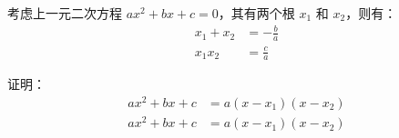 
\begin{issues}
\end{issues}


\begin{theorem}{}
考虑上一元二次方程 $a x^2 + b x + c = 0$，其有两个根 $x_1$ 和 $x_2$，则有：
$$\begin{aligned}
x_1 + x_2 &= -\frac{b}{a} \\
x_1 x_2 &= \frac{c}{a}
\end{aligned}$$
\end{theorem}

证明：
$$\begin{aligned}
a x^2 + b x + c &= a (x - x_1) (x - x_2) \\
a x^2 + b x + c &= a (x - x_1) (x - x_2) \\
\end{aligned}$$